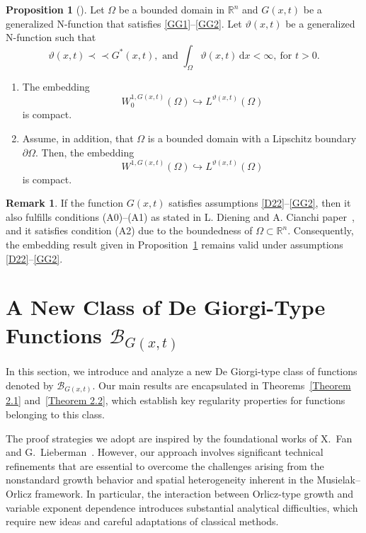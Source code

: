 \documentclass[10pt,reqno]{amsart}
\newcommand *\w{^\wedge}
\theoremstyle{definition}
\newtheorem{proposition}[theorem]{Proposition}
\newtheorem{remark}[theorem]{Remark}
\numberwithin{equation}{section}
\begin{document}
\begin{proposition}[\cite{Cianchi2024}]\label{embb}
Let $\Omega$ be a bounded domain in $\mathbb{R}^n$ and $G(x,t)$ be a generalized \textnormal{N}-function that satisfies \eqref{GG1}--\eqref{GG2}. Let $\vartheta(x,t)$ be a generalized \textnormal{N}-function such that
\begin{equation}
\vartheta(x,t)\prec \prec G^*(x,t),\text{  and   } \int_{\Omega} \vartheta(x,t) \, \mathrm{d}x < \infty,\ \text{for } t>0.
\end{equation}
\begin{enumerate}
\item[(1)] The embedding
\begin{equation}
W^{1,G(x,t)}_0(\Omega) \hookrightarrow L^{\vartheta(x,t)}(\Omega) 
\end{equation}
is compact.

\item[(2)] Assume, in addition, that $\Omega$ is a bounded domain with a Lipschitz boundary $\partial \Omega$. Then, the embedding
\begin{equation}
W^{1,G(x,t)}(\Omega) \hookrightarrow L^{\vartheta(x,t)}(\Omega) 
\end{equation}
is compact.
\end{enumerate}
\end{proposition}
\begin{remark}
If the function $G(x,t)$ satisfies assumptions \eqref{D22}--\eqref{GG2}, then it also fulfills conditions (A0)--(A1) as stated in L. Diening and A. Cianchi paper~\cite{Cianchi2024}, and it satisfies condition (A2) due to the boundedness of $\Omega \subset \mathbb{R}^n$. Consequently, the embedding result given in Proposition~\ref{embb} remains valid under assumptions \eqref{D22}--\eqref{GG2}.
\end{remark}
\section{A New Class of De Giorgi-Type Functions \texorpdfstring{$\mathcal{B}_{G(x,t)}$}{$B_{G(x,t)}$}}

In this section, we introduce and analyze a new De Giorgi-type class of functions denoted by \( \mathcal{B}_{G(x,t)} \). Our main results are encapsulated in Theorems~\ref{Theorem 2.1} and~\ref{Theorem 2.2}, which establish key regularity properties for functions belonging to this class.

The proof strategies we adopt are inspired by the foundational works of X.~Fan~\cite{Fan1999} and G.~Lieberman~\cite{Li1991}. However, our approach involves significant technical refinements that are essential to overcome the challenges arising from the nonstandard growth behavior and spatial heterogeneity inherent in the Musielak–Orlicz framework. In particular, the interaction between Orlicz-type growth and variable exponent dependence introduces substantial analytical difficulties, which require new ideas and careful adaptations of classical methods.
\end{document}
